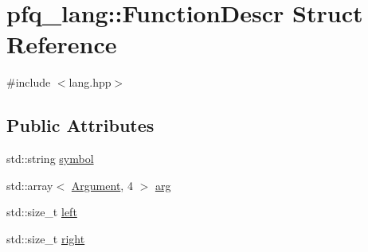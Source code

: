 \hypertarget{structpfq__lang_1_1FunctionDescr}{\section{pfq\+\_\+lang\+:\+:Function\+Descr Struct Reference}
\label{structpfq__lang_1_1FunctionDescr}
}


{\ttfamily \#include $<$lang.\+hpp$>$}

\subsection*{Public Attributes}
\begin{DoxyCompactItemize}
\item 
std\+::string \hyperlink{structpfq__lang_1_1FunctionDescr_a58a21262184201b670246fdfdf0cef92}{symbol}
\item 
std\+::array$<$ \hyperlink{structpfq__lang_1_1Argument}{Argument}, 4 $>$ \hyperlink{structpfq__lang_1_1FunctionDescr_a30060a300e3162c65b2bcaf8bde97709}{arg}
\item 
std\+::size\+\_\+t \hyperlink{structpfq__lang_1_1FunctionDescr_a480af36e2436822c212bc0886f28c076}{left}
\item 
std\+::size\+\_\+t \hyperlink{structpfq__lang_1_1FunctionDescr_a36c36e8d567da963d826bed62c9b750f}{right}
\end{DoxyCompactItemize}


